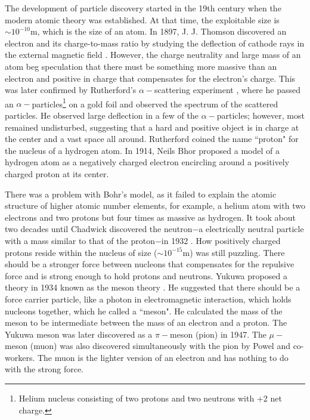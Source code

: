 The development of particle discovery started in the 19th century when the modern atomic theory was established. At that time, the exploitable size is $\sim 10^{-10}$m, which is the size of an atom. In 1897, J. J. Thomson discovered an electron and its charge-to-mass ratio by studying the deflection of cathode rays in the external magnetic field \cite{electronJJ}. However, the charge neutrality and large mass of an atom beg speculation that there must be something more massive than an electron and positive in charge that compensates for the electron's charge. This was later confirmed by Rutherford's $\alpha-$scattering experiment \cite{GigerMarsden}, where he passed an $\alpha-$particles\footnote{Helium nucleus consisting of two protons and two neutrons with +2 net charge.} on a gold foil and observed the spectrum of the scattered particles. He observed large deflection in a few of the $\alpha -$particles; however, most remained undisturbed, suggesting that a hard and positive object is in charge at the center and a vast space all around. Rutherford coined the name ``proton" for the nucleus of a hydrogen atom. In 1914, Neils Bhor proposed a model of a hydrogen atom as a negatively charged electron encircling around a positively charged proton at its center. 

There was a problem with Bohr's model, as it failed to explain the atomic structure of higher atomic number elements, for example, a helium atom with two electrons and two protons but four times as massive as hydrogen. It took about two decades until Chadwick discovered the neutron$-$a electrically neutral particle with a mass similar to that of the proton$-$in 1932 \cite{chadwickNeutron}. How positively charged protons reside within the nucleus of size ($\sim 10^{-15}$m) was still puzzling. There should be a stronger force  between nucleons that compensates for the repulsive force and is strong enough to hold protons and neutrons. Yukuwa proposed a theory in 1934 known as the meson theory \cite{Yukawa:1935xg}. He suggested that there should be a force carrier particle, like a photon in electromagnetic interaction, which holds nucleons together, which he called a ``meson". He calculated the mass of the meson to be intermediate between the mass of an electron and a proton. The Yukuwa meson was later discovered as a $\pi-$meson (pion) in 1947. The $\mu-$meson (muon) was also discovered simultaneously with the pion by Powel and co-workers. The muon is the lighter version of an electron and has nothing to do with the strong force.

